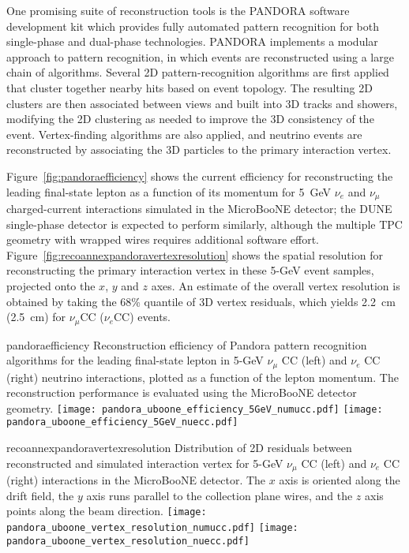 One promising suite of reconstruction tools is the PANDORA software
development kit\cite{Marshall:2013bda,Marshall:2012hh} which provides
fully automated pattern recognition for both single-phase and
dual-phase technologies.  PANDORA implements a modular approach to
pattern recognition, in which events are reconstructed using a large
chain of algorithms.  Several 2D pattern-recognition algorithms are
first applied that cluster together nearby hits based on event
topology.  The resulting 2D clusters are then associated between views
and built into 3D tracks and showers, modifying the 2D clustering as
needed to improve the 3D consistency of the event.  Vertex-finding
algorithms are also applied, and neutrino events are reconstructed by
associating the 3D particles to the primary interaction vertex.

Figure~\ref{fig:pandoraefficiency} shows the current efficiency for
reconstructing the leading final-state lepton as a function of its
momentum for 5~GeV $\nu_{e}$ and $\nu_{\mu}$ charged-current
interactions simulated in the MicroBooNE detector; the DUNE
single-phase detector is expected to perform similarly, although the
multiple TPC geometry with wrapped wires requires additional software
effort.
Figure~\ref{fig:recoannexpandoravertexresolution} shows the spatial
resolution for reconstructing the primary interaction vertex in these
5-GeV event samples, projected onto the $x$, $y$ and $z$ axes. An
estimate of the overall vertex resolution is obtained by taking the
68\% quantile of 3D vertex residuals, which yields 2.2~cm (2.5~cm)
for $\nu_{\mu}$CC ($\nu_{e}$CC) events.
\begin{cdrfigure}{pandoraefficiency}
{Reconstruction efficiency of Pandora pattern recognition algorithms
 for the leading final-state lepton in 5-GeV $\nu_{\mu}$ CC (left) and
 $\nu_{e}$ CC (right) neutrino interactions, plotted as a function of
 the lepton momentum. The reconstruction performance is evaluated
 using the MicroBooNE detector geometry. }
\texttt{[image: pandora\_uboone\_efficiency\_5GeV\_numucc.pdf]}
\texttt{[image: pandora\_uboone\_efficiency\_5GeV\_nuecc.pdf]}
\end{cdrfigure}
\begin{cdrfigure}{recoannexpandoravertexresolution}
{Distribution of 2D residuals between reconstructed and simulated interaction
 vertex for 5-GeV $\nu_{\mu}$ CC (left) and $\nu_{e}$ CC (right) interactions in the MicroBooNE detector.
 The $x$ axis is oriented along the drift field, the $y$ axis runs parallel 
 to the collection plane wires, and the $z$ axis points along the beam direction.}
\texttt{[image: pandora\_uboone\_vertex\_resolution\_numucc.pdf]}
\texttt{[image: pandora\_uboone\_vertex\_resolution\_nuecc.pdf]}
\end{cdrfigure}

